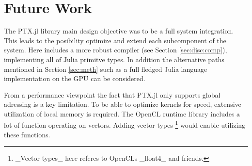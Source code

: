 \chapter{Future Work}
\begin{markdown}

The PTX.jl library main design objective was to be a full system
integration. This leads to the posibility optimize and extend each
subcomponent of the system. Here includes a more robust compiler (see
Section \ref{sec:disc:comp}), implementing all of Julia primitve
types. In addition the alternative paths mentioned in Section
\ref{sec:meth} such as a full fledged Julia language implementation on
the GPU can be considered.

From a performance viewpoint the fact that PTX.jl only supports global
adressing is a key limitation. To be able to optimize kernels for
speed, extensive utilization of local memory is required. The OpenCL
runtime library includes a lot of function operating on
vectors. Adding vector types \footnote{_Vector types_ here referes to
  OpenCLs _float4_ and friends.} would enable utilizing these
functions.

\end{markdown}
